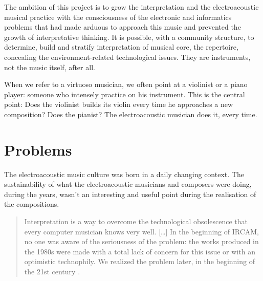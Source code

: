 \documentclass[twoside,a4paper]{article}
\begin{document}
The ambition of this project is to grow the interpretation and the electroacoustic
musical practice with the consciousness of the electronic and informatics problems
that had made arduous to approach this music and prevented the growth of
interpretative thinking. It is possible, with a community structure, to determine,
build and stratify interpretation of musical core, the repertoire, concealing the
environment-related technological issues. They are instruments, not the music
itself, after all.

When we refer to a virtuoso musician, we often point at a violinist or a piano
player: someone who intensely practice on his instrument. This is the central
point: Does the violinist builds its violin every time he approaches a new
composition? Does the pianist? The electroacoustic musician does it, every time.



\section{Problems}
\label{sec:problems}

The electroacoustic music culture was born in a daily changing context. The
sustainability of what the electroacoustic musicians and composers were doing,
during the years, wasn't an interesting and useful point during the realisation
of the compositions.

\begin{quote}
Interpretation is a way to overcome the technological obsolescence that every
computer musician knows very well. [\ldots] In the beginning of IRCAM, no one was
aware of the seriousness of the problem: the works produced in the 1980s were
made with a total lack of concern for this issue or with an optimistic technophily.
We realized the problem later, in the beginning of the 21st century \cite{lem16}.
\end{quote}
\end{document}

